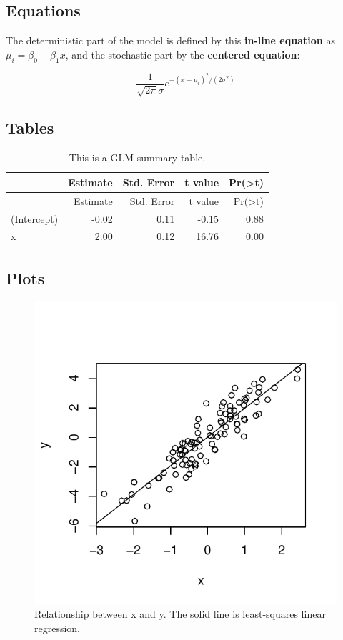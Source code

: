 \documentclass[12pt,]{article}
\begin{document}
\subsection{Equations}\label{equations}

The deterministic part of the model is defined by this \textbf{in-line
equation} as \(\mu_i = \beta_0 + \beta_1x\), and the stochastic part by
the \textbf{centered equation}:

\[ \frac{1}{\sqrt{2\pi}\sigma}e^{-(x-\mu_i)^2/(2\sigma^2)} \]

\subsection{Tables}\label{tables}

\begin{longtable}[]{@{}lrrrr@{}}
\caption{This is a GLM summary table.}\tabularnewline
\toprule
& Estimate & Std. Error & t value &
Pr(\textgreater{}\textbar{}t\textbar{})\tabularnewline
\midrule
\endfirsthead
\toprule
& Estimate & Std. Error & t value &
Pr(\textgreater{}\textbar{}t\textbar{})\tabularnewline
\midrule
\endhead
(Intercept) & -0.02 & 0.11 & -0.15 & 0.88\tabularnewline
x & 2.00 & 0.12 & 16.76 & 0.00\tabularnewline
\bottomrule
\end{longtable}

\subsection{Plots}\label{plots}

\begin{figure}[htbp]
\centering
\includegraphics{manuscript_template_files/figure-latex/carDataPlot-1.pdf}
\caption{Relationship between x and y. The solid line is least-squares
linear regression.}
\end{figure}
\end{document}
